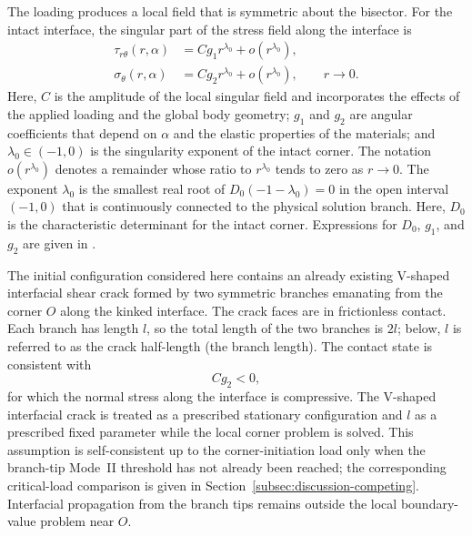 \documentclass[pdflatex,onecolumn,sn-mathphys-ay]{sn-jnl}
\begin{document}
The loading produces a local field that is symmetric about the bisector.
For the intact interface, the singular part of the stress field along the
interface is
\begin{equation*}
\begin{aligned}
  \tau_{r\theta}(r,\alpha)
    &= Cg_1 r^{\lambda_0}+o\!\left(r^{\lambda_0}\right),\\
  \sigma_\theta(r,\alpha)
    &= Cg_2 r^{\lambda_0}+o\!\left(r^{\lambda_0}\right),
    \qquad r\to0.
\end{aligned}
\end{equation*}
Here, $C$ is the amplitude of the local singular field and incorporates the
effects of the applied loading and the global body geometry; $g_1$ and
$g_2$ are angular coefficients that depend on $\alpha$ and the elastic
properties of the materials; and $\lambda_0\in(-1,0)$ is the singularity
exponent of the intact corner. The notation $o(r^{\lambda_0})$ denotes a
remainder whose ratio to $r^{\lambda_0}$ tends to zero as $r\to0$.
The exponent $\lambda_0$ is the smallest real root of
$D_0(-1-\lambda_0)=0$ in the open interval $(-1,0)$ that is continuously
connected to the physical solution branch. Here, $D_0$ is the characteristic
determinant for the intact corner. Expressions for $D_0$, $g_1$, and $g_2$
are given in \AsymptoticsAppendix.

The initial configuration considered here contains an already existing
V-shaped interfacial shear crack formed by two symmetric branches emanating
from the corner $O$ along the kinked interface. The crack faces are in
frictionless contact. Each branch has length $l$, so the total length of the
two branches is $2l$; below, $l$ is referred to as the crack half-length
(the branch length). The contact state is consistent with
\begin{equation*}
  Cg_2<0,
\end{equation*}
for which the normal stress along the interface is compressive. The
V-shaped interfacial crack is treated as a prescribed stationary
configuration and $l$ as a prescribed fixed parameter while the local
corner problem is solved. This assumption is self-consistent up to the
corner-initiation load only when the branch-tip Mode~II threshold has not
already been reached; the corresponding critical-load comparison is given in
Section~\ref{subsec:discussion-competing}. Interfacial propagation from the
branch tips remains outside the local boundary-value problem near $O$.
\end{document}
